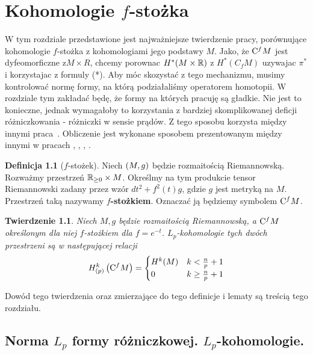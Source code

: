 \documentclass[licencjacka]{pracamgr}
\theoremstyle{definition}
\newtheorem{definition}{Definicja}[section]
\theoremstyle{definition}
\theoremstyle{plain}
\theoremstyle{plain}
\theoremstyle{plain}
\newtheorem{theorem}{Twierdzenie}[section]
\theoremstyle{plain}
\def\cfm{\ensuremath\mathrm{C}^fM}
\def\M{\ensuremath M}
\def\R{\ensuremath\mathbb{R}}
\begin{document}
\chapter{Kohomologie $f$-stożka}
W tym rozdziale przedstawione jest najważniejsze twierdzenie pracy, porównujące
kohomologie $f$-stożka z kohomologiami jego podstawy $M$.
Jako, że $\cfm$ jest dyfeomorficzne z$ M\times R$, chcemy porownac $H^*(M\times \R)$
z $H^*(C_fM)$ uzywajac $\pi^*$ i korzystajac z formuly (*).
Aby móc skozystać z tego mechanizmu, musimy kontrolować normę formy, na którą
podziałaliśmy operatorem homotopii.
W rozdziale tym zakładać będę, że formy na których pracuję są gładkie. Nie jest
to konieczne, jednak wymagałoby to korzystania z bardziej skomplikowanej deficji
różniczkowania - różniczki w sensie prądów. Z tego sposobu korzysta między innymi
praca~\cite{weber}.
Obliczenie jest wykonane sposobem prezentowanym między innymi w
pracach \cite{cheeger}, \cite{youssin}, \cite{kirwan}, \cite{weber}. \\


\begin{definition}[$f$-stożek]
    Niech $(\M, g)$ będzie rozmaitością Riemannowską. Rozważmy przestrzeń
    $\mathbb{R}_{\geq 0} \times \M$. Określmy na tym produkcie tensor
    Riemannowski zadany przez wzór $dt^2 + f^{2}(t)g $, gdzie $g$ jest
    metryką na $M$.  Przestrzeń taką nazywamy \textbf{$f$-stożkiem}.
    Oznaczać ją będziemy symbolem $\cfm$.
\end{definition}

\begin{theorem}
  Niech $M,g$ będzie rozmaitością Riemannowską, a $\cfm$ określonym dla niej
  $f$-stożkiem dla $f = e^{-t}$. $L_p$-kohomologie tych dwóch przestrzeni są
  w następującej relacji
  \begin{equation}
    H_{(p)}^k \left( \cfm \right) = \begin{cases}
      H^k(M) & k < \frac{n}{p} + 1 \\
      0 & k \geq  \frac{n}{p} + 1 \\
      \end{cases}
  \end{equation}
\end{theorem}

Dowód tego twierdzenia oraz zmierzające do tego definicje i lematy są treścią tego
rozdziału. \\

\section{Norma $L_p$ formy różniczkowej. $L_p$-kohomologie.}
\end{document}
